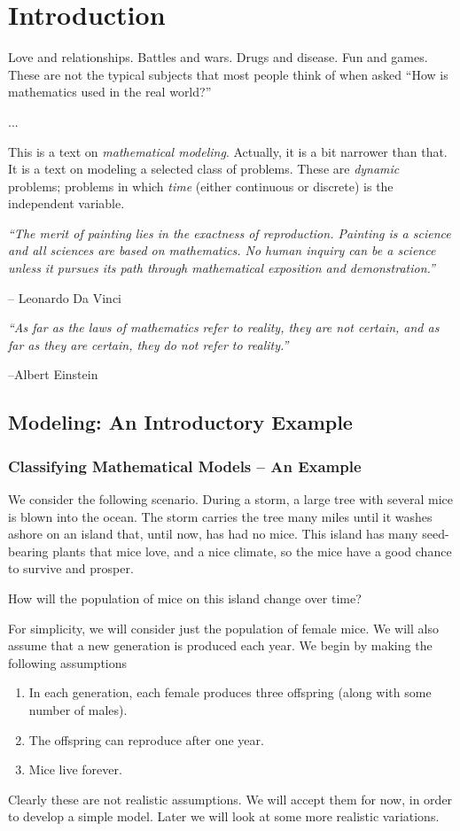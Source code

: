 \chapter{Introduction}
%
Love and relationships.  Battles and wars.
Drugs and disease. Fun and games.
These are not the typical subjects that most
people think of when asked ``How is mathematics used
in the real world?''

...

This is a text on \emph{mathematical modeling}.
Actually, it is a bit narrower than that.
It is a text on modeling a selected class of
problems.  These are \emph{dynamic} problems;
problems in which \emph{time} (either continuous
or discrete) is the independent variable.

\bigskip
\noindent
\emph{``The merit of painting lies in the exactness of reproduction.
      Painting is a science and all sciences are based on mathematics. 
      No human inquiry can be a science unless it pursues its path
      through mathematical exposition and demonstration.''}

\hfill -- Leonardo Da Vinci

\bigskip
\noindent
\emph{``As far as the laws of mathematics refer to reality, they are not
certain, and as far as they are certain, they do not refer to reality.''}

\hfill  --Albert Einstein

%
%
\newpage

\section{Modeling: An Introductory Example}

\subsection*{Classifying Mathematical Models -- An Example}
We consider the following scenario.
During a storm, a large tree with several
mice is blown into the ocean.  The storm carries the
tree many miles until it washes ashore on an
island that, until now, has had no mice.
This island has many seed-bearing plants that
mice love, and a nice climate, so the mice
have a good chance to survive and prosper.

How will the population of mice on this island
change over time?

For simplicity, we will consider just the population of female
mice.
We will also assume that a new generation is produced
each year.
We begin by making the following assumptions
\begin{enumerate}
\item In each generation, each female produces three offspring
(along with some number of males).
\item The offspring can reproduce after one year.
\item Mice live forever.
\end{enumerate}
Clearly these are not realistic assumptions.
We will accept them for now, in order to develop
a simple model.  Later we will look at some more
realistic variations.

